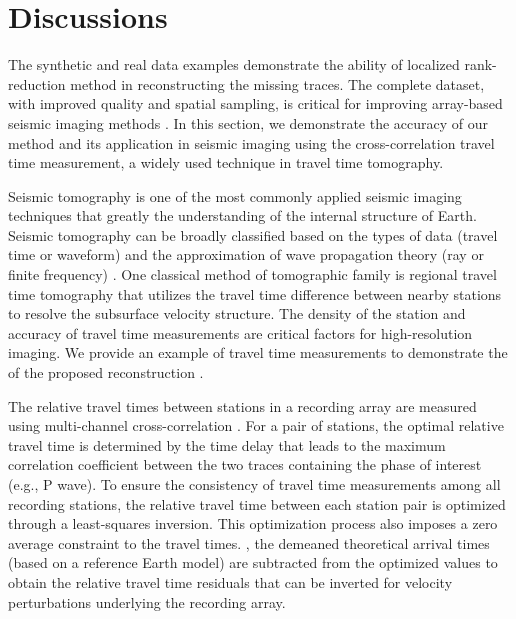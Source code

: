 \section*{Discussions}
The synthetic and real data examples demonstrate the ability of localized rank-reduction method in reconstructing the missing traces. The complete dataset, with improved quality and spatial sampling, is critical for improving array-based seismic imaging methods \cite[]{rost2002array, gu2010arrays}.  In this section, we demonstrate the accuracy of our method and its  application in seismic imaging using the cross-correlation travel time measurement, a widely used technique in travel time tomography.

Seismic tomography is one of the most commonly applied seismic imaging techniques that greatly  the understanding of the internal structure of Earth. Seismic tomography can be broadly classified based on the types of data (travel time or waveform) and the approximation of wave propagation theory (ray or finite frequency) \cite[]{liu2012seismic}. One classical method of  tomographic family is regional travel time tomography \cite[]{aki1977determination} that utilizes the travel time difference between nearby stations to resolve the subsurface velocity structure. The density of the station and  accuracy of travel time measurements are critical factors for high-resolution imaging. We provide an example of travel time measurements to demonstrate the  of the proposed reconstruction .

The relative travel times between stations in a recording array are measured using multi-channel cross-correlation \cite[]{vandecar1990determination}.  For a pair of stations, the optimal relative travel time is determined by the time delay that leads to the maximum correlation coefficient between the two traces containing the phase of interest (e.g., P wave). To ensure the consistency of travel time measurements among all recording stations, the relative travel time between each station pair is optimized through a least-squares inversion. This optimization process also imposes a zero average constraint to the travel times.  , the demeaned theoretical arrival times (based on a reference Earth model) are subtracted from the optimized values to obtain the relative travel time residuals that can be inverted for velocity perturbations underlying the recording array.

